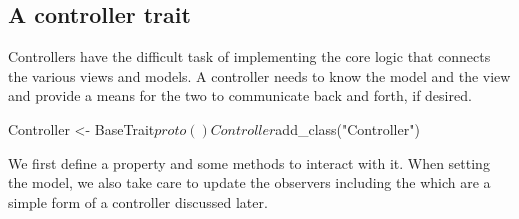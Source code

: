 \documentclass{memoir}
\begin{document}
\subsection{A controller trait}
\label{sec:controller-trait}
Controllers have the difficult task of implementing the core logic
that connects the various views and models. A controller needs to know
the model and the view and provide a means for the two to communicate
back and forth, if desired. 
\begin{Schunk}
\begin{Sinput}
 Controller <- BaseTrait$proto()
 Controller$add_class("Controller")
\end{Sinput}
\end{Schunk}
We first define a  property and some methods to interact
with it. When setting the model, we also take care to update the
observers including the  which are a simple form of a
controller discussed later.
\begin{Schunk}
\end{Schunk}
\end{document}
